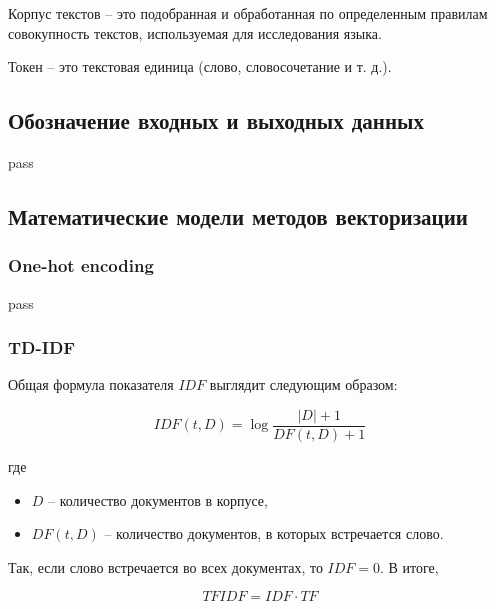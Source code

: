 \documentclass[14pt, a4paper, titlepage]{extarticle}
\begin{document}
            Корпус текстов
            -- это подобранная и обработанная по определенным
            правилам совокупность текстов, используемая для
            исследования языка.

            Токен
            -- это текстовая единица (слово, словосочетание
            и т. д.).

        \newpage

        \subsection{Обозначение входных и выходных данных}
            pass

        \newpage

        \subsection{Математические модели методов векторизации}
            \subsubsection{One-hot encoding}
                pass

            \subsubsection{TD-IDF}
                Общая формула показателя $IDF$ выглядит
                следующим образом:

                \begin{equation*}
                    IDF(t, D) = \log{
                        \frac{|D| + 1}{DF(t, D) + 1}
                    }
                \end{equation*}

                где

                \begin{itemize}
                    \item $D$
                    -- количество документов в корпусе,
                    \item $DF(t, D)$
                    -- количество документов, в которых
                    встречается слово.
                \end{itemize}

                Так, если слово встречается во всех документах,
                то $IDF = 0$. В итоге,
                
                \begin{equation*}
                    TFIDF = IDF \cdot TF
                \end{equation*}
\end{document}
